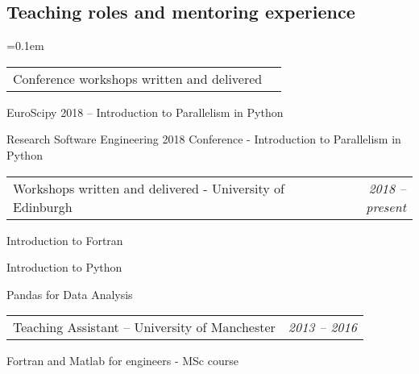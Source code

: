 \documentclass[10.5pt,a4]{article}
\makeatletter
\newcommand{\headerrow}[2]
{\begin{tabular*}{\linewidth}{l@{\extracolsep{\fill}}r}
	#1 &
	#2 \\
\end{tabular*}}
\makeatother
\begin{document}
\subsection*{Teaching roles and mentoring experience} 
	\parskip=0.1em
\begin{itemize*}
	\item
	\headerrow
	{Conference workshops written and delivered}
	{}
	  \begin{itemize*}
	  \item EuroScipy 2018 -- Introduction to Parallelism in Python
	  \item Research Software Engineering 2018 Conference - Introduction to Parallelism in Python
	  \end{itemize*}

	\item
	\headerrow
	{Workshops written and delivered - University of Edinburgh}
	{\textit{2018 -- present}}
	  \begin{itemize*}
	  \item Introduction to Fortran
	  \item Introduction to Python
	  \item Pandas for Data Analysis
	  \end{itemize*}
	  


	\item
	\headerrow
	{Teaching Assistant -- University of Manchester}
	{\textit{2013 -- 2016}}
	  \begin{itemize*}
	  \item Fortran and Matlab for engineers - MSc course
	  \end{itemize*}
\end{itemize*}
\end{document}
